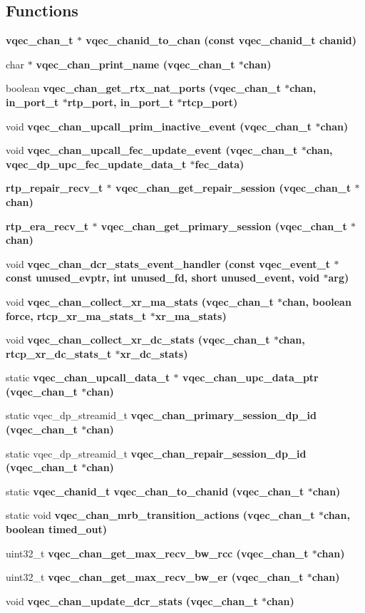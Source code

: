 \subsection*{Functions}
\begin{CompactItemize}
\item 
\bf{vqec\_\-chan\_\-t} $\ast$ \bf{vqec\_\-chanid\_\-to\_\-chan} (const \bf{vqec\_\-chanid\_\-t} chanid)
\item 
char $\ast$ \bf{vqec\_\-chan\_\-print\_\-name} (\bf{vqec\_\-chan\_\-t} $\ast$chan)
\item 
boolean \bf{vqec\_\-chan\_\-get\_\-rtx\_\-nat\_\-ports} (\bf{vqec\_\-chan\_\-t} $\ast$chan, in\_\-port\_\-t $\ast$rtp\_\-port, in\_\-port\_\-t $\ast$rtcp\_\-port)
\item 
void \bf{vqec\_\-chan\_\-upcall\_\-prim\_\-inactive\_\-event} (\bf{vqec\_\-chan\_\-t} $\ast$chan)
\item 
void \bf{vqec\_\-chan\_\-upcall\_\-fec\_\-update\_\-event} (\bf{vqec\_\-chan\_\-t} $\ast$chan, vqec\_\-dp\_\-upc\_\-fec\_\-update\_\-data\_\-t $\ast$fec\_\-data)
\item 
\bf{rtp\_\-repair\_\-recv\_\-t} $\ast$ \bf{vqec\_\-chan\_\-get\_\-repair\_\-session} (\bf{vqec\_\-chan\_\-t} $\ast$chan)
\item 
\bf{rtp\_\-era\_\-recv\_\-t} $\ast$ \bf{vqec\_\-chan\_\-get\_\-primary\_\-session} (\bf{vqec\_\-chan\_\-t} $\ast$chan)
\item 
void \bf{vqec\_\-chan\_\-dcr\_\-stats\_\-event\_\-handler} (const vqec\_\-event\_\-t $\ast$const unused\_\-evptr, int unused\_\-fd, short unused\_\-event, void $\ast$arg)
\item 
void \bf{vqec\_\-chan\_\-collect\_\-xr\_\-ma\_\-stats} (\bf{vqec\_\-chan\_\-t} $\ast$chan, boolean force, rtcp\_\-xr\_\-ma\_\-stats\_\-t $\ast$xr\_\-ma\_\-stats)
\item 
void \bf{vqec\_\-chan\_\-collect\_\-xr\_\-dc\_\-stats} (\bf{vqec\_\-chan\_\-t} $\ast$chan, rtcp\_\-xr\_\-dc\_\-stats\_\-t $\ast$xr\_\-dc\_\-stats)
\item 
static \bf{vqec\_\-chan\_\-upcall\_\-data\_\-t} $\ast$ \bf{vqec\_\-chan\_\-upc\_\-data\_\-ptr} (\bf{vqec\_\-chan\_\-t} $\ast$chan)
\item 
static vqec\_\-dp\_\-streamid\_\-t \bf{vqec\_\-chan\_\-primary\_\-session\_\-dp\_\-id} (\bf{vqec\_\-chan\_\-t} $\ast$chan)
\item 
static vqec\_\-dp\_\-streamid\_\-t \bf{vqec\_\-chan\_\-repair\_\-session\_\-dp\_\-id} (\bf{vqec\_\-chan\_\-t} $\ast$chan)
\item 
static \bf{vqec\_\-chanid\_\-t} \bf{vqec\_\-chan\_\-to\_\-chanid} (\bf{vqec\_\-chan\_\-t} $\ast$chan)
\item 
static void \bf{vqec\_\-chan\_\-mrb\_\-transition\_\-actions} (\bf{vqec\_\-chan\_\-t} $\ast$chan, boolean timed\_\-out)
\item 
uint32\_\-t \bf{vqec\_\-chan\_\-get\_\-max\_\-recv\_\-bw\_\-rcc} (\bf{vqec\_\-chan\_\-t} $\ast$chan)
\item 
uint32\_\-t \bf{vqec\_\-chan\_\-get\_\-max\_\-recv\_\-bw\_\-er} (\bf{vqec\_\-chan\_\-t} $\ast$chan)
\item 
void \bf{vqec\_\-chan\_\-update\_\-dcr\_\-stats} (\bf{vqec\_\-chan\_\-t} $\ast$chan)
\end{CompactItemize}
